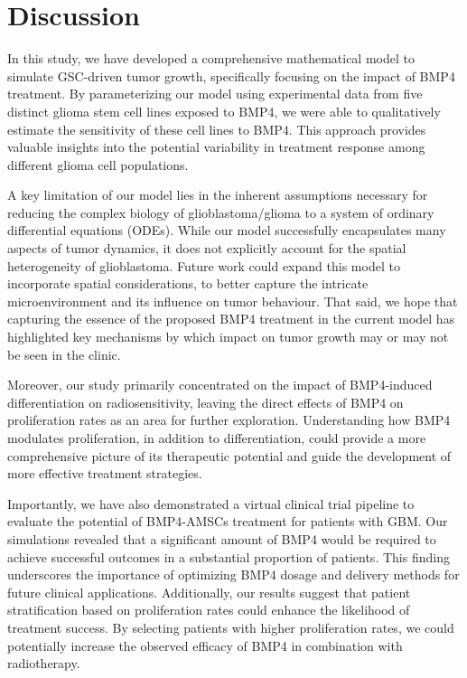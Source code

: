 \documentclass[
  letterpaper,
]{scrreprt}
\theoremstyle{definition}
\theoremstyle{remark}
\begin{document}
\section{Discussion}\label{sec-discussion}

In this study, we have developed a comprehensive mathematical model to
simulate GSC-driven tumor growth, specifically focusing on the impact of
BMP4 treatment. By parameterizing our model using experimental data from
five distinct glioma stem cell lines exposed to BMP4, we were able to
qualitatively estimate the sensitivity of these cell lines to BMP4. This
approach provides valuable insights into the potential variability in
treatment response among different glioma cell populations.

A key limitation of our model lies in the inherent assumptions necessary
for reducing the complex biology of glioblastoma/glioma to a system of
ordinary differential equations (ODEs). While our model successfully
encapsulates many aspects of tumor dynamics, it does not explicitly
account for the spatial heterogeneity of glioblastoma. Future work could
expand this model to incorporate spatial considerations, to better
capture the intricate microenvironment and its influence on tumor
behaviour. That said, we hope that capturing the essence of the proposed
BMP4 treatment in the current model has highlighted key mechanisms by
which impact on tumor growth may or may not be seen in the clinic.

Moreover, our study primarily concentrated on the impact of BMP4-induced
differentiation on radiosensitivity, leaving the direct effects of BMP4
on proliferation rates as an area for further exploration. Understanding
how BMP4 modulates proliferation, in addition to differentiation, could
provide a more comprehensive picture of its therapeutic potential and
guide the development of more effective treatment strategies.

Importantly, we have also demonstrated a virtual clinical trial pipeline
to evaluate the potential of BMP4-AMSCs treatment for patients with GBM.
Our simulations revealed that a significant amount of BMP4 would be
required to achieve successful outcomes in a substantial proportion of
patients. This finding underscores the importance of optimizing BMP4
dosage and delivery methods for future clinical applications.
Additionally, our results suggest that patient stratification based on
proliferation rates could enhance the likelihood of treatment success.
By selecting patients with higher proliferation rates, we could
potentially increase the observed efficacy of BMP4 in combination with
radiotherapy.
\end{document}
